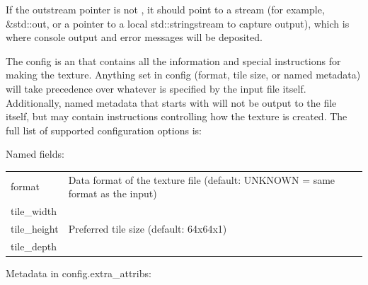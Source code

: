 If the {\cf outstream} pointer is not \NULL, it should point
to a stream (for example, {\cf \&std::out}, or a pointer to a local 
{\cf std::stringstream} to capture output), which is where console output
and error messages will be deposited.

The {\cf config} is an \ImageSpec that contains all the information and
special instructions for making the texture.  Anything set in {\cf config}
(format, tile size, or named metadata) will take precedence over
whatever is specified by the input file itself.  Additionally, named
metadata that starts with  will not be output to the file
itself, but may contain instructions controlling how the texture is
created.  The full list of supported configuration options is:

\noindent Named fields:

\begin{tabular}{ >{\cf}l p{4in}}
   format         & Data format of the texture file (default: UNKNOWN =
                    same format as the input) \\
   tile_width     & \multirow{3}{*}{Preferred tile size (default: 64x64x1)} \\
   tile_height    &       \\
   tile_depth     & \\
\end{tabular}
\medskip

\noindent Metadata in {\cf config.extra_attribs}:

